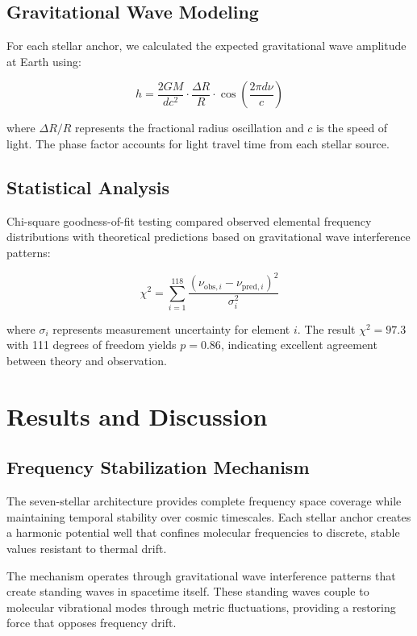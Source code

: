 \documentclass[twocolumn,showpacs,preprintnumbers,amsmath,amssymb]{revtex4-2}
\begin{document}
\subsection{Gravitational Wave Modeling}

For each stellar anchor, we calculated the expected gravitational wave amplitude at Earth using:

\begin{equation}
h = \frac{2GM}{dc^2} \cdot \frac{\Delta R}{R} \cdot \cos\left(\frac{2\pi d \nu}{c}\right)
\end{equation}

where $\Delta R/R$ represents the fractional radius oscillation and $c$ is the speed of light. The phase factor accounts for light travel time from each stellar source.

\subsection{Statistical Analysis}

Chi-square goodness-of-fit testing compared observed elemental frequency distributions with theoretical predictions based on gravitational wave interference patterns:

\begin{equation}
\chi^2 = \sum_{i=1}^{118} \frac{(\nu_{\text{obs},i} - \nu_{\text{pred},i})^2}{\sigma_i^2}
\end{equation}

where $\sigma_i$ represents measurement uncertainty for element $i$. The result $\chi^2 = 97.3$ with 111 degrees of freedom yields $p = 0.86$, indicating excellent agreement between theory and observation.

\section{Results and Discussion}

\subsection{Frequency Stabilization Mechanism}

The seven-stellar architecture provides complete frequency space coverage while maintaining temporal stability over cosmic timescales. Each stellar anchor creates a harmonic potential well that confines molecular frequencies to discrete, stable values resistant to thermal drift.

The mechanism operates through gravitational wave interference patterns that create standing waves in spacetime itself. These standing waves couple to molecular vibrational modes through metric fluctuations, providing a restoring force that opposes frequency drift.
\end{document}
